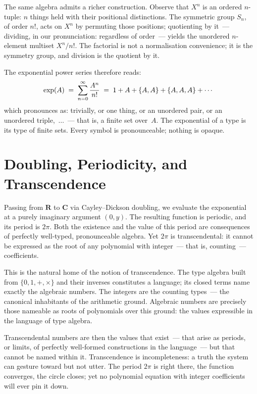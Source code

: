 The same algebra admits a richer construction. Observe that $X^n$ is an ordered
$n$-tuple: $n$ things held {\itfont with\/} their positional distinctions. The
symmetric group $S_n$, of order $n!$, acts on $X^n$ by permuting those positions;
quotienting by it~--- dividing, in our pronunciation: {\itfont regardless of
order\/}~--- yields the unordered $n$-element multiset $X^n/n!$. The factorial
is not a normalisation convenience; it {\itfont is\/} the symmetry group, and
division is the quotient by it.

The exponential power series therefore reads:
$$\exp(A) \;=\; \sum_{n=0}^\infty {A^n \over n!}
  \;=\; 1 + A + \{A,A\} + \{A,A,A\} + \cdots$$
which pronounces as: {\itfont trivially, or one thing, or an unordered pair, or
an unordered triple,~$\ldots$\/}~--- that is, a finite set over~$A$. The
exponential of a type is its type of finite sets. Every symbol is pronounceable;
nothing is opaque.

\section{Doubling, Periodicity, and Transcendence}

Passing from $\mathbf{R}$ to $\mathbf{C}$ via Cayley--Dickson doubling, we
evaluate the exponential at a purely imaginary argument $(0, y)$. The resulting
function is periodic, and its period is $2\pi$. Both the existence and the value
of this period are consequences of perfectly well-typed, pronounceable algebra.
Yet $2\pi$ is transcendental: it cannot be expressed as the root of any polynomial
with integer~--- that is, {\itfont counting\/}~--- coefficients.

This is the natural home of the notion of transcendence. The type algebra built
from $\{0, 1, {+}, {\times}\}$ and their inverses constitutes a language; its
closed terms name exactly the algebraic numbers. The integers are the
{\itfont counting types\/}~--- the canonical inhabitants of the arithmetic ground.
Algebraic numbers are precisely those nameable as roots of polynomials over this
ground: the values {\itfont expressible\/} in the language of type algebra.

Transcendental numbers are then the values that {\itfont exist\/}~--- that arise
as periods, or limits, of perfectly well-formed constructions in the language~---
but that {\itfont cannot be named\/} within it. Transcendence is incompleteness:
a truth the system can gesture toward but not utter. The period $2\pi$ is right
there, the function converges, the circle closes; yet no polynomial equation with
integer coefficients will ever pin it down.

